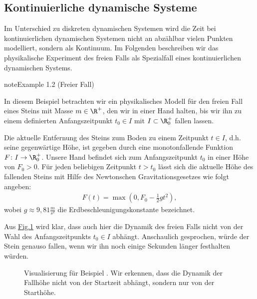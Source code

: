 \documentclass[letterpaper,10pt,english]{jupyterBook}
\begin{document}
\subsection{Kontinuierliche dynamische Systeme}
\label{\detokenize{ode/dynamicSystems:kontinuierliche-dynamische-systeme}}
Im Unterschied zu diskreten dynamischen Systemen wird die Zeit bei kontinuierlichen dynamischen Systemen nicht an abzählbar vielen Punkten modelliert, sondern als Kontinuum.
Im Folgenden beschreiben wir das physikalische Experiment des freien Falls als Spezialfall eines kontinuierlichen dynamischen Systems.
\label{ode/dynamicSystems:ex:freefall}
\begin{sphinxadmonition}{note}{Example 1.2 (Freier Fall)}



In diesem Beispiel betrachten wir ein physikalisches Modell für den freien Fall eines Steins mit Masse \(m \in \R^+\), den wir in einer Hand halten, bis wir ihn zu einem definierten Anfangszeitpunkt \(t_0 \in I\) mit \(I \subset \R^+_0\) fallen lassen.

Die aktuelle Entfernung des Steins zum Boden zu einem Zeitpunkt \(t \in I\), d.h. seine gegenwärtige Höhe, ist gegeben durch eine monoton\sphinxhyphen{}fallende Funktion \(F \colon I \rightarrow \R^+_0\).
Unsere Hand befindet sich zum Anfangszeitpunkt \(t_0\) in einer Höhe von \(F_0 > 0\).
Für jeden beliebigen Zeitpunkt \(t > t_0\) lässt sich die aktuelle Höhe des fallenden Steins mit Hilfe des Newtonschen Gravitationsgesetzes wie folgt angeben:
\begin{equation*}
\begin{split}F(t) = \max(0, F_0 - \frac{1}{2}gt^2),\end{split}
\end{equation*}
wobei \(g \approx 9,81 \frac{m}{s^2}\) die Erdbeschleunigungskonstante bezeichnet.

Aus \hyperref[\detokenize{ode/dynamicSystems:fig-free-fall}]{Fig.\@ \ref{\detokenize{ode/dynamicSystems:fig-free-fall}}} wird klar, dass auch hier die Dynamik des freien Falls nicht von der Wahl des Anfangszeitpunkts \(t_0 \in I\) abhängt.
Anschaulich gesprochen, würde der Stein genauso fallen, wenn wir ihn noch einige Sekunden länger festhalten würden.
\end{sphinxadmonition}

\begin{figure}[htbp]
\centering
\capstart

\noindent{}
\caption{Visualisierung für Beispiel {\hyperref[\detokenize{ode/dynamicSystems:ex:freefall}]{}}. Wir erkennen, dass die Dynamik der Fallhöhe nicht von der Startzeit abhängt, sondern nur von der Starthöhe.}\label{\detokenize{ode/dynamicSystems:fig-free-fall}}\end{figure}
\end{document}
